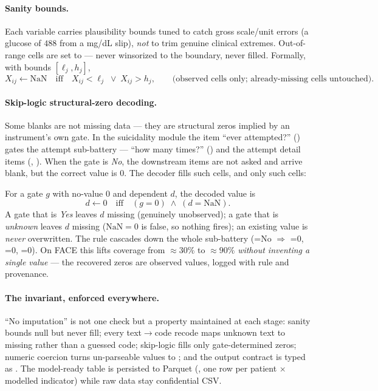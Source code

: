 \paragraph{Sanity bounds.} Each variable carries plausibility bounds tuned to catch gross scale/unit errors
(a glucose of $488$ from a mg/dL slip), \emph{not} to trim genuine clinical extremes. Out-of-range cells are set
to  --- never winsorized to the boundary, never filled. Formally, with bounds $[\ell_j,h_j]$, 
\[
X_{ij} \leftarrow \mathrm{NaN}\quad\text{iff}\quad X_{ij}<\ell_j \;\lor\; X_{ij}>h_j ,
\qquad\text{(observed cells only; already-missing cells untouched).}
\]

\paragraph{Skip-logic structural-zero decoding.} Some blanks are not missing data --- they are structural
zeros implied by an instrument's own gate. In the suicidality module the item ``ever attempted?''
() gates the attempt sub-battery --- ``how many times?'' () and the attempt detail items
(, ). When the gate is \emph{No}, the downstream items are not asked and arrive blank,
but the correct value is $0$. The decoder fills such cells, and only such cells:

\begin{methodsbox}
For a gate $g$ with no-value $0$ and dependent $d$, the decoded value is
\[
d \leftarrow 0 \quad\text{iff}\quad (g = 0)\;\land\;(d=\mathrm{NaN}).
\]
A gate that is \emph{Yes} leaves $d$ missing (genuinely unobserved); a gate that is \emph{unknown} leaves $d$
missing ($\mathrm{NaN}=0$ is false, so nothing fires); an existing value is \emph{never} overwritten. The rule
cascades down the whole sub-battery (=No $\Rightarrow$ =0, =0,
=0). On FACE this lifts  coverage from $\approx 30\%$ to $\approx 90\%$ \emph{without
inventing a single value} --- the recovered zeros are observed values, logged with rule and provenance.
\end{methodsbox}

\paragraph{The invariant, enforced everywhere.} ``No imputation'' is not one check but a property maintained at
each stage: sanity bounds null but never fill; every text$\to$code recode maps unknown text to missing rather
than a guessed code; skip-logic fills only gate-determined zeros; numeric coercion turns un-parseable values to
; and the output contract is typed as . The model-ready table is persisted to
Parquet (, one row per patient $\times$ modelled indicator) while raw
data stay confidential CSV.

